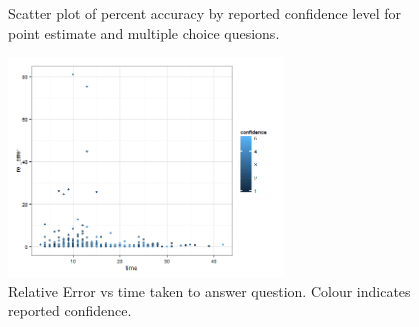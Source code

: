 \documentclass[12pt]{article}
\begin{document}
\begin{figure}[ht!]
     \begin{center}
    \end{center}
    \caption{Scatter plot of percent accuracy by reported confidence level for point estimate and multiple choice quesions. }
\end{figure}



\begin{figure}[ht!]
\begin{center}
\includegraphics[width=0.65\textwidth]{../../output/demo_analysis/time_rel_error.png}
\caption{Relative Error vs time taken to answer question. Colour indicates reported confidence.}
\end{center}	
\end{figure}
\end{document}
